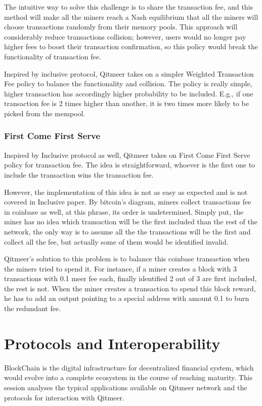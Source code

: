 \documentclass[a4paper,11pt]{article}
\begin{document}
The intuitive way to solve this challenge is to share the transaction fee, and this method will make all the miners reach a Nash equilibrium that all the miners will choose transactions randomly from their memory pools. This approach will considerably reduce transactions collision; however, users would no longer pay higher fees to boost their transaction confirmation, so this policy would break the functionality of transaction fee.

Inspired by inclusive protocol, Qitmeer takes on a simpler Weighted Transaction Fee policy to balance the functionality and collision. The policy is really simple, higher transaction has accordingly higher probability to be included. E.g., if one transaction fee is 2 times higher than another, it is two times more likely to be picked from the mempool.

\subsubsection{First Come First Serve}
Inspired by Inclusive protocol as well, Qitmeer takes on First Come First Serve policy for transaction fee. The idea is straightforward, whoever is the first one to include the transaction wins the transaction fee.

However, the implementation of this idea is not as easy as expected and is not covered in Inclusive paper. By bitcoin's diagram, miners collect transactions fee in coinbase as well, at this phrase, its order is undetermined. Simply put, the miner has no idea which transaction will be the first included than the rest of the network, the only way is to assume all the the transactions will be the first and collect all the fee, but actually some of them would be identified invalid.

Qitmeer's solution to this problem is to balance this coinbase transaction when the miners tried to spend it. For instance, if a miner creates a block with 3 transactions with 0.1 meer fee each, finally identified 2 out of 3 are first included, the rest is not. When the miner creates a transaction to spend this block reward, he has to add an output pointing to a special address with amount 0.1 to burn the redundant fee.

\section{Protocols and Interoperability}
BlockChain is the digital infrastructure for decentralized financial system, which would evolve into a complete ecosystem in the course of reaching maturity. This session analyses the typical applications available on  Qitmeer network and the protocols for interaction with Qitmeer. 
\end{document}
